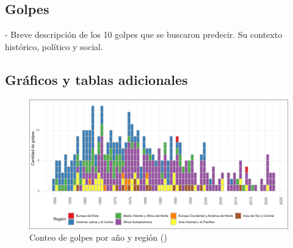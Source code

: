 \documentclass{article}
\begin{document}
\subsection{Golpes}
- Breve descripción de los 10 golpes que se buscaron predecir. Su contexto histórico, político y 
social.
\subsection{Gráficos y tablas adicionales}
\begin{figure}[H]
  \centering  
  \includegraphics[width=1\textwidth]{4_golpes_anios.png}
  \caption{Conteo de golpes por año y región (\cite{Pow11})\label{fig:golpes_anios}}
\end{figure}
\end{document}
